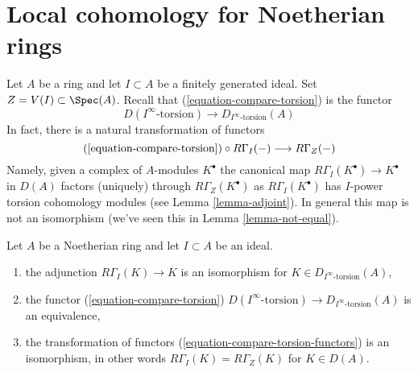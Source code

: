 \section{Local cohomology for Noetherian rings}
\label{section-local-cohomology-noetherian}

\noindent
Let $A$ be a ring and let $I \subset A$ be a finitely generated ideal.
Set $Z = V(I) \subset \Spec(A)$. Recall that (\ref{equation-compare-torsion})
is the functor
$$
D(I^\infty\text{-torsion}) \to D_{I^\infty\text{-torsion}}(A)
$$
In fact, there is a natural transformation of functors
\begin{equation}
\label{equation-compare-torsion-functors}
(\ref{equation-compare-torsion}) \circ R\Gamma_I(-)
\longrightarrow
R\Gamma_Z(-)
\end{equation}
Namely, given a complex of $A$-modules $K^\bullet$ the canonical map
$R\Gamma_I(K^\bullet) \to K^\bullet$ in $D(A)$ factors (uniquely)
through $R\Gamma_Z(K^\bullet)$ as $R\Gamma_I(K^\bullet)$ has
$I$-power torsion cohomology modules (see Lemma \ref{lemma-adjoint}).
In general this map is not an isomorphism (we've seen this in
Lemma \ref{lemma-not-equal}).

\begin{lemma}
\label{lemma-local-cohomology-noetherian}
Let $A$ be a Noetherian ring and let $I \subset A$ be an ideal.
\begin{enumerate}
\item the adjunction $R\Gamma_I(K) \to K$ is an isomorphism
for $K \in D_{I^\infty\text{-torsion}}(A)$,
\item the functor
(\ref{equation-compare-torsion})
$D(I^\infty\text{-torsion}) \to D_{I^\infty\text{-torsion}}(A)$
is an equivalence,
\item the transformation of functors
(\ref{equation-compare-torsion-functors}) is an isomorphism,
in other words $R\Gamma_I(K) = R\Gamma_Z(K)$ for $K \in D(A)$.
\end{enumerate}
\end{lemma}

